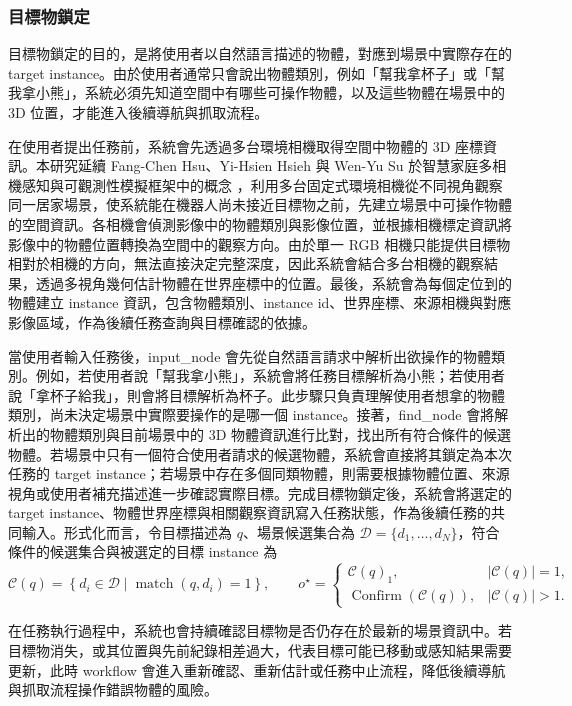 \documentclass[12pt,a4paper]{article}
\begin{document}
\subsubsection{目標物鎖定}

目標物鎖定的目的，是將使用者以自然語言描述的物體，對應到場景中實際存在的 target instance。由於使用者通常只會說出物體類別，例如「幫我拿杯子」或「幫我拿小熊」，系統必須先知道空間中有哪些可操作物體，以及這些物體在場景中的 3D 位置，才能進入後續導航與抓取流程。

在使用者提出任務前，系統會先透過多台環境相機取得空間中物體的 3D 座標資訊。本研究延續 Fang-Chen Hsu、Yi-Hsien Hsieh 與 Wen-Yu Su 於智慧家庭多相機感知與可觀測性模擬框架中的概念 \cite{hsu_multicam}，利用多台固定式環境相機從不同視角觀察同一居家場景，使系統能在機器人尚未接近目標物之前，先建立場景中可操作物體的空間資訊。各相機會偵測影像中的物體類別與影像位置，並根據相機標定資訊將影像中的物體位置轉換為空間中的觀察方向。由於單一 RGB 相機只能提供目標物相對於相機的方向，無法直接決定完整深度，因此系統會結合多台相機的觀察結果，透過多視角幾何估計物體在世界座標中的位置。最後，系統會為每個定位到的物體建立 instance 資訊，包含物體類別、instance id、世界座標、來源相機與對應影像區域，作為後續任務查詢與目標確認的依據。

當使用者輸入任務後，input\_node 會先從自然語言請求中解析出欲操作的物體類別。例如，若使用者說「幫我拿小熊」，系統會將任務目標解析為小熊；若使用者說「拿杯子給我」，則會將目標解析為杯子。此步驟只負責理解使用者想拿的物體類別，尚未決定場景中實際要操作的是哪一個 instance。接著，find\_node 會將解析出的物體類別與目前場景中的 3D 物體資訊進行比對，找出所有符合條件的候選物體。若場景中只有一個符合使用者請求的候選物體，系統會直接將其鎖定為本次任務的 target instance；若場景中存在多個同類物體，則需要根據物體位置、來源視角或使用者補充描述進一步確認實際目標。完成目標物鎖定後，系統會將選定的 target instance、物體世界座標與相關觀察資訊寫入任務狀態，作為後續任務的共同輸入。形式化而言，令目標描述為 $q$、場景候選集合為 $\mathcal{D}=\{d_1,\ldots,d_N\}$，符合條件的候選集合與被選定的目標 instance 為
\begin{equation}
    \mathcal{C}(q)=\left\{d_i\in\mathcal{D}\mid \operatorname{match}(q,d_i)=1\right\},
    \qquad
    o^{\star}=\begin{cases}
    \mathcal{C}(q)_1, & |\mathcal{C}(q)|=1,\\
    \operatorname{Confirm}(\mathcal{C}(q)), & |\mathcal{C}(q)|>1.
    \end{cases}
\end{equation}

在任務執行過程中，系統也會持續確認目標物是否仍存在於最新的場景資訊中。若目標物消失，或其位置與先前紀錄相差過大，代表目標可能已移動或感知結果需要更新，此時 workflow 會進入重新確認、重新估計或任務中止流程，降低後續導航與抓取流程操作錯誤物體的風險。
\end{document}
